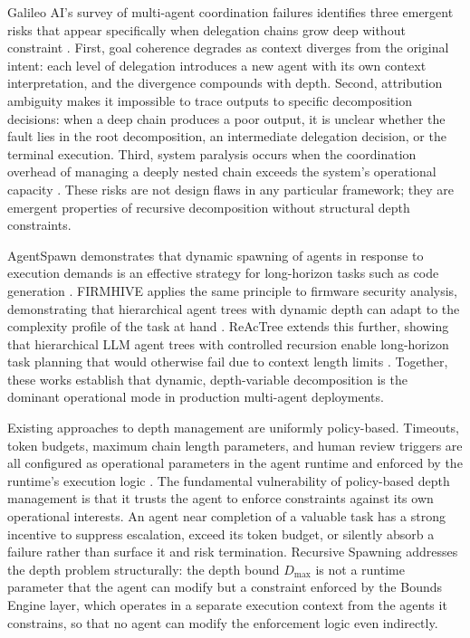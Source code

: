 Galileo AI's survey of multi-agent coordination failures identifies three emergent risks that appear specifically when delegation chains grow deep without constraint \cite{multi_agent_coordination_strategies}.  First, goal coherence degrades as context diverges from the original intent: each level of delegation introduces a new agent with its own context interpretation, and the divergence compounds with depth.  Second, attribution ambiguity makes it impossible to trace outputs to specific decomposition decisions: when a deep chain produces a poor output, it is unclear whether the fault lies in the root decomposition, an intermediate delegation decision, or the terminal execution.  Third, system paralysis occurs when the coordination overhead of managing a deeply nested chain exceeds the system's operational capacity \cite{multi_agent_coordination_strategies}.  These risks are not design flaws in any particular framework; they are emergent properties of recursive decomposition without structural depth constraints.

AgentSpawn demonstrates that dynamic spawning of agents in response to execution demands is an effective strategy for long-horizon tasks such as code generation \cite{agentspawn2025}.  FIRMHIVE applies the same principle to firmware security analysis, demonstrating that hierarchical agent trees with dynamic depth can adapt to the complexity profile of the task at hand \cite{firmhive2025}.  ReAcTree extends this further, showing that hierarchical LLM agent trees with controlled recursion enable long-horizon task planning that would otherwise fail due to context length limits \cite{reactree2025}.  Together, these works establish that dynamic, depth-variable decomposition is the dominant operational mode in production multi-agent deployments.

Existing approaches to depth management are uniformly policy-based.  Timeouts, token budgets, maximum chain length parameters, and human review triggers are all configured as operational parameters in the agent runtime and enforced by the runtime's execution logic \cite{multi_agent_coordination_strategies}.  The fundamental vulnerability of policy-based depth management is that it trusts the agent to enforce constraints against its own operational interests.  An agent near completion of a valuable task has a strong incentive to suppress escalation, exceed its token budget, or silently absorb a failure rather than surface it and risk termination.  Recursive Spawning addresses the depth problem structurally: the depth bound $D_{\max}$ is not a runtime parameter that the agent can modify but a constraint enforced by the \bxthree{} Bounds Engine layer, which operates in a separate execution context from the agents it constrains, so that no agent can modify the enforcement logic even indirectly.

